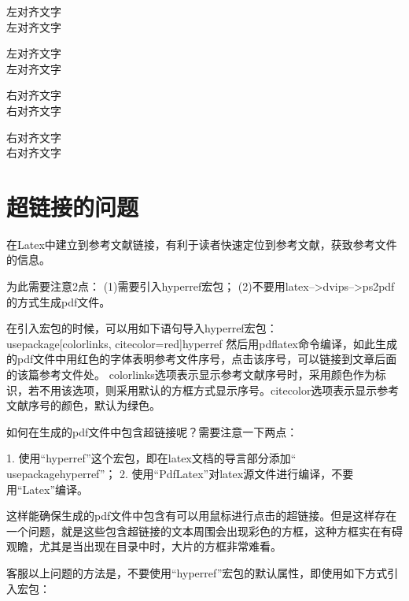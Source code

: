 \documentclass[11pt,a4paper]{article}
\begin{document}
\begin{flushleft}
左对齐文字 \\
左对齐文字
\end{flushleft}
 
\noindent
\begin{minipage}{\linewidth}
\raggedright
左对齐文字 \\
左对齐文字
\end{minipage}
 
\begin{flushright}
右对齐文字 \\
右对齐文字
\end{flushright}
 
\noindent
\begin{minipage}{\linewidth}
\raggedleft
右对齐文字 \\
右对齐文字
\end{minipage}


\section{超链接的问题}

 在Latex中建立到参考文献链接，有利于读者快速定位到参考文献，获致参考文件的信息。

为此需要注意2点： (1)需要引入hyperref宏包； (2)不要用latex-->dvips-->ps2pdf的方式生成pdf文件。

在引入宏包的时候，可以用如下语句导入hyperref宏包：
\\usepackage[colorlinks, citecolor=red]{hyperref}
然后用pdflatex命令编译，如此生成的pdf文件中用红色的字体表明参考文件序号，点击该序号，可以链接到文章后面的该篇参考文件处。
colorlinks选项表示显示参考文献序号时，采用颜色作为标识，若不用该选项，则采用默认的方框方式显示序号。citecolor选项表示显示参考文献序号的颜色，默认为绿色。

 如何在生成的pdf文件中包含超链接呢？需要注意一下两点：

1. 使用“hyperref”这个宏包，即在latex文档的导言部分添加“\\usepackage{hyperref}”；
2. 使用“PdfLatex”对latex源文件进行编译，不要用“Latex”编译。

 

这样能确保生成的pdf文件中包含有可以用鼠标进行点击的超链接。但是这样存在一个问题，就是这些包含超链接的文本周围会出现彩色的方框，这种方框实在有碍观瞻，尤其是当出现在目录中时，大片的方框非常难看。

客服以上问题的方法是，不要使用“hyperref”宏包的默认属性，即使用如下方式引入宏包：
\end{document}

